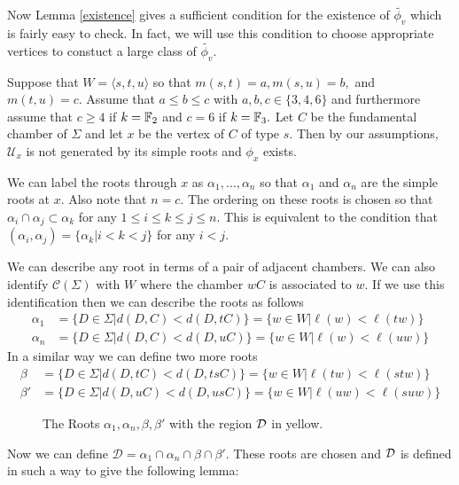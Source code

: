 \documentclass[class=book, crop=false,12 pt]{standalone}
\begin{document}
Now Lemma \ref{existence} gives a sufficient condition for the existence of $\tilde{\phi_v}$ which is fairly easy to check. In fact, we will use this condition to choose appropriate vertices to constuct a large class of $\tilde{\phi_v}.$

Suppose that $W=\langle s,t,u \rangle$ so that $m(s,t)=a,m(s,u)=b,$ and $m(t,u)=c.$ Assume that $a\le b\le c$ with $a,b,c\in \{3,4,6\}$ and furthermore assume that $c\ge 4$ if $k=\mathbb{F}_{2}$ and $c=6$ if $k=\mathbb{F}_{3}.$ Let $C$ be the fundamental chamber of $\Sigma$ and let $x$ be the vertex of $C$ of type $s.$ Then by our assumptions, $\mathcal{U}_x$ is not generated by its simple roots and $\phi_x$ exists.

We can label the roots through $x$ as $\alpha_1,\dots,\alpha_n$ so that $\alpha_1$ and $\alpha_n$ are the simple roots at $x.$ Also note that $n=c.$ The ordering on these roots is chosen so that $\alpha_i\cap \alpha_j\subset \alpha_k$ for any $1\le i \le k \le j\le n.$ This is equivalent to the condition that $(\alpha_i,\alpha_j)=\{\alpha_k|i<k<j\}$ for any $i<j.$

We can describe any root in terms of a pair of adjacent chambers. We can also identify $\mathcal{C}(\Sigma)$ with $W$ where the chamber $wC$ is associated to $w.$ If we use this identification then we can describe the roots as follows
\begin{align*}
	\alpha_1&=\{D\in \Sigma|d(D,C)<d(D,tC)\}=\{w\in W|\ell(w)<\ell(tw)\}\\
	\alpha_n&=\{D\in \Sigma|d(D,C)<d(D,uC)\}=\{w\in W|\ell(w)<\ell(uw)\}
\end{align*}
In a similar way we can define two more roots
\begin{align*}
	\beta&=\{D\in \Sigma|d(D,tC)<d(D,tsC)\}=\{w\in W|\ell(tw)<\ell(stw)\}\\
	\beta'&=\{D\in \Sigma|d(D,uC)<d(D,usC)\}=\{w\in W|\ell(uw)<\ell(suw)\}
\end{align*}
\begin{figure}[h]
	\label{defineD}
	\begin{center}
	\caption{The Roots $\alpha_1,\alpha_n,\beta,\beta'$ with the region $\mathcal{D}$ in yellow.}
\end{center}
\end{figure}

Now we can define $\mathcal{D}=\alpha_1\cap \alpha_n \cap \beta\cap \beta'.$ These roots are chosen and $\mathcal{D}$ is defined in such a way to give the following lemma:
\end{document}
